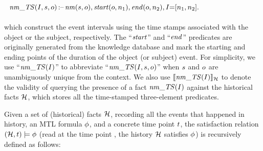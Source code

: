 \noindent 
{\small $\ \   
\mathit{nm}\_{\mathit{TS}}(I, s, o) \,\text{:--}\, \mathit{nm}(s, o), \mathit{start}(o, n_1), \mathit{end}(o, n_2), I{=}[n_1, n_2]. 
$}\\[-0.5em]

\\

\noindent which construct the event intervals using the time stamps associated with the object or the subject, respectively. 
The ``$\mathit{start}$'' and ``$\mathit{end}$'' predicates are originally generated from the knowledge database and mark the starting and ending points of the duration of the object (or subject) event. 
For simplicity, we use ``$\mathit{nm}\_{\mathit{TS}}(I)$'' to abbreviate ``$\mathit{nm}\_{\mathit{TS}}(I, s, o)$'' when $s$ and $o$ are unambiguously unique from the context. 
We also use $\llbracket \nm\_{\m{TS}}(\interval) %
\rrbracket_{\history}$ to denote the validity of querying the presence of a fact $\mathit{nm}\_{\mathit{TS}}(I)$ 
against the historical facts $\mathcal{H}$, which stores all the time-stamped three-element predicates. 


\begin{definition}
\label{def:semantics_MTL}
Given a set of (historical) facts $\mathcal{H}$, recording all the events that happened in history, an MTL formula $\phi$, and a concrete time point  $t$, the satisfaction relation $(\mathcal{H}, t) \models \phi$  (read at the time point \timepoint, the history $\mathcal{H}$ satisfies $\phi$) is recursively defined as follows: 

{
\small
\begin{align*}








\end{align*}}
\end{definition}
\vspace{2mm}



